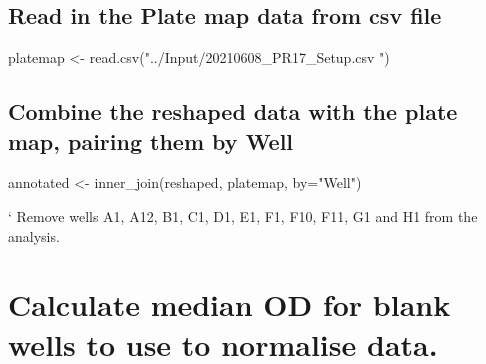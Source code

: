 \documentclass[
]{article}
\newenvironment{Shaded}{\begin{snugshade}}{\end{snugshade}}
\newcommand{\AttributeTok}[1]{\textcolor[rgb]{0.77,0.63,0.00}{#1}}
\newcommand{\FunctionTok}[1]{\textcolor[rgb]{0.00,0.00,0.00}{#1}}
\newcommand{\NormalTok}[1]{#1}
\newcommand{\OtherTok}[1]{\textcolor[rgb]{0.56,0.35,0.01}{#1}}
\newcommand{\StringTok}[1]{\textcolor[rgb]{0.31,0.60,0.02}{#1}}
\begin{document}
\hypertarget{read-in-the-plate-map-data-from-csv-file}{%
\subsection{Read in the Plate map data from csv
file}\label{read-in-the-plate-map-data-from-csv-file}}

\begin{Shaded}
\begin{Highlighting}[]
\NormalTok{platemap }\OtherTok{\textless{}{-}} \FunctionTok{read.csv}\NormalTok{(}\StringTok{"../Input/20210608\_PR17\_Setup.csv "}\NormalTok{)}
\end{Highlighting}
\end{Shaded}

\hypertarget{combine-the-reshaped-data-with-the-plate-map-pairing-them-by-well}{%
\subsection{Combine the reshaped data with the plate map, pairing them
by
Well}\label{combine-the-reshaped-data-with-the-plate-map-pairing-them-by-well}}

\begin{Shaded}
\begin{Highlighting}[]
\NormalTok{annotated }\OtherTok{\textless{}{-}} \FunctionTok{inner\_join}\NormalTok{(reshaped, platemap, }\AttributeTok{by=}\StringTok{"Well"}\NormalTok{)}
\end{Highlighting}
\end{Shaded}

` Remove wells A1, A12, B1, C1, D1, E1, F1, F10, F11, G1 and H1 from the
analysis.

\hypertarget{calculate-median-od-for-blank-wells-to-use-to-normalise-data.}{%
\section{Calculate median OD for blank wells to use to normalise
data.}\label{calculate-median-od-for-blank-wells-to-use-to-normalise-data.}}
\end{document}
